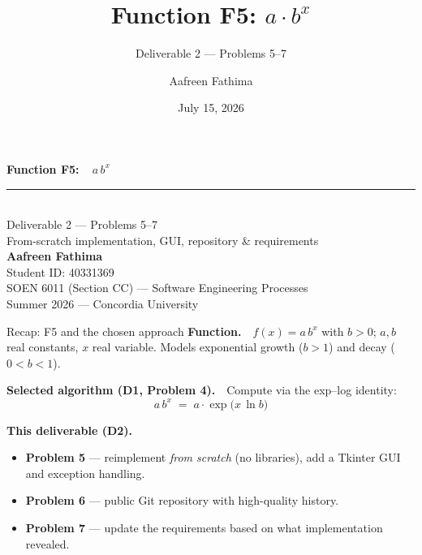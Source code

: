 \documentclass[10pt,aspectratio=169]{beamer}
\title{Function F5: $a\cdot b^{x}$}
\subtitle{Deliverable 2 --- Problems 5--7}
\author{Aafreen Fathima}
\institute{SOEN 6011 (Section CC) --- Software Engineering Processes\\ Summer 2026, Concordia University}
\date{July 15, 2026}
\begin{document}
{
\begin{frame}[plain]
  \vfill
  \begin{center}
    {\Large\bfseries\textcolor{mDarkTeal}{Function F5:\ \ $a\,b^{x}$}}\\[0.4em]
    \textcolor{mAccent}{\rule{0.55\textwidth}{1.2pt}}\\[0.8em]
    {\large Deliverable 2 --- Problems 5--7}\\[0.4em]
    {\small From-scratch implementation, GUI, repository \& requirements}\\[1.6em]
    \textbf{Aafreen Fathima}\\[0.3em]
    \small Student ID: 40331369\\[1.2em]
    \small SOEN 6011 (Section CC) --- Software Engineering Processes\\
    \small Summer 2026 --- Concordia University
  \end{center}
  \vfill
\end{frame}}

\begin{frame}{Recap: F5 and the chosen approach}
  \small
  \textbf{Function.}\ \ $f(x) = a\,b^{x}$ with $b>0$; $a,b$ real constants, $x$ real variable. Models exponential growth ($b>1$) and decay ($0<b<1$).
  \vspace{0.5em}

  \textbf{Selected algorithm (D1, Problem 4).}\ \ Compute via the exp--log identity:
  \[ a\,b^{x} \;=\; a\cdot\exp\!\big(x\,\ln b\big) \]
  \vspace{0.2em}

  \textbf{This deliverable (D2).}
  \begin{itemize}\setlength\itemsep{0.2em}
    \item \textbf{Problem 5} --- reimplement \emph{from scratch} (no libraries), add a Tkinter GUI and exception handling.
    \item \textbf{Problem 6} --- public Git repository with high-quality history.
    \item \textbf{Problem 7} --- update the requirements based on what implementation revealed.
  \end{itemize}
\end{frame}

\end{document}

